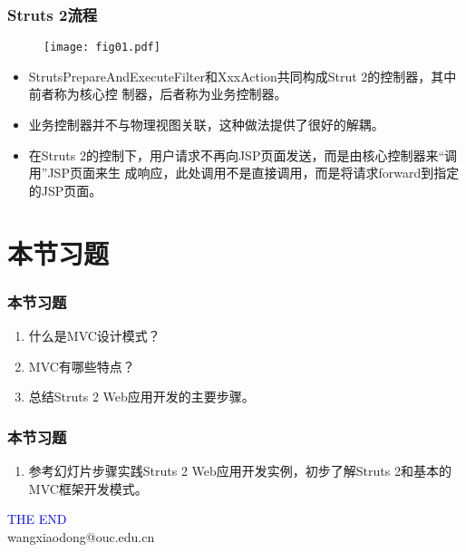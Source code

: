 \begin{frame}[fragile] %
  \frametitle{Struts 2流程}
  \begin{figure}
    \centering
    \texttt{[image: fig01.pdf]}
  \end{figure}
  \begin{itemize}\small\kai
  \item StrutsPrepareAndExecuteFilter和XxxAction共同构成Strut 2的控制器，其中前者称为核心控
    制器，后者称为业务控制器。
  \item 业务控制器并不与物理视图关联，这种做法提供了很好的解耦。
  \item 在Struts 2的控制下，用户请求不再向JSP页面发送，而是由核心控制器来“调用”JSP页面来生
    成响应，此处调用不是直接调用，而是将请求forward到指定的JSP页面。
  \end{itemize}
\end{frame}

\section{本节习题}

\begin{frame}
  \frametitle{本节习题}

  
  \begin{enumerate}
  \item 什么是MVC设计模式？
  \item MVC有哪些特点？
  \item 总结Struts 2 Web应用开发的主要步骤。
  \end{enumerate}
\end{frame}
  
\begin{frame}
  \frametitle{本节习题}
  

  \begin{enumerate}
  \item 参考幻灯片步骤实践Struts 2 Web应用开发实例，初步了解Struts 2和基本的MVC框架开发模式。
  \end{enumerate}
\end{frame}
\begin{frame}
\centering
{\Huge \textcolor{blue}{THE END}} \\
\vspace{5mm}
{\Large wangxiaodong@ouc.edu.cn} \\
\end{frame}

